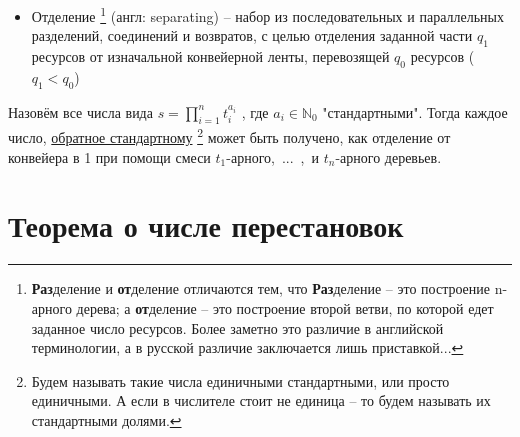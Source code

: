 \begin{itemize}
		
	\item Отделение%
	\footnote{\textbf{Раз}деление и \textbf{от}деление отличаются тем, что \textbf{Раз}деление -- это построение n-арного дерева; а \textbf{от}деление -- это построение второй ветви, по которой едет заданное число ресурсов. Более заметно это различие в английской терминологии, а в русской различие заключается лишь приставкой...}
	(англ: separating) -- набор из последовательных и параллельных разделений, соединений и возвратов, с целью отделения заданной части $q_1$ ресурсов от изначальной конвейерной ленты, перевозящей $q_0$ ресурсов ($q_1 < q_0$)
		
		
\end{itemize}














\vspace{0.5in}


Назовём все числа вида $s = \prod_{i=1}^n t_i^{a_i}$ , где $a_i \in \mathbb{N}_0$ "стандартными". Тогда каждое число, \underline{обратное стандартному}%
\footnote{Будем называть такие числа единичными стандартными, или просто единичными. А если в числителе стоит не единица -- то будем называть их стандартными долями.} 
может быть получено, как отделение от конвейера в 1 при помощи смеси $t_1$-арного,~...~,~и $t_n$-арного деревьев.






\vspace{0.5in}

\section{Теорема о числе перестановок}

